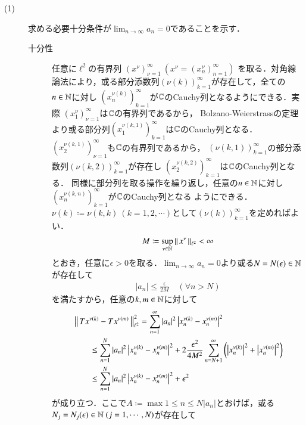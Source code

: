 	\begin{prf}\mbox{}
		\begin{description}
			\item[(1)] 求める必要十分条件が$\lim_{n \to \infty} a_n = 0$であることを示す．
				\begin{description}
					\item[十分性] 任意に$\ell^2$の有界列
						$\left( x^{\nu} \right)_{\nu=1}^{\infty}\ \left(x^{\nu} = \left( x^{\nu}_n \right)_{n=1}^{\infty} \right)$
						を取る．対角線論法により，或る部分添数列$(\nu(k))_{k=1}^{\infty}$が存在して，全ての$n \in \mathbb{N}$に対し
						$\left(x_n^{\nu(k)} \right)_{k=1}^{\infty}$が$\mathbb{C}$のCauchy列となるようにできる．実際
						$\left( x^{\nu}_1 \right)_{\nu=1}^{\infty}$は$\mathbb{C}$の有界列であるから，
						Bolzano-Weierstrassの定理より或る部分列$\left( x^{\nu(k,1)}_1 \right)_{k=1}^{\infty}$は$\mathbb{C}$のCauchy列となる．
						$\left( x^{\nu(k,1)}_2 \right)_{\nu=1}^{\infty}$も$\mathbb{C}$の有界列であるから，
						$(\nu(k,1))_{k=1}^{\infty}$の部分添数列$(\nu(k,2))_{k=1}^{\infty}$が存在し
						$\left( x^{\nu(k,2)}_2 \right)_{k=1}^{\infty}$は$\mathbb{C}$のCauchy列となる．
						同様に部分列を取る操作を繰り返し，任意の$n \in \mathbb{N}$に対し
						$\left( x^{\nu(k,n)}_n \right)_{k=1}^{\infty}$が$\mathbb{C}$のCauchy列となる
						ようにできる．$\nu(k) \coloneqq \nu(k,k)\ (k=1,2,\cdots)$として$(\nu(k))_{k=1}^{\infty}$を定めればよい．
						\begin{align}
							M \coloneqq \operatorname*{sup}_{\nu \in \mathbb{N}} \left\|\, x^\nu\, \right\|_{\ell^2} < \infty
						\end{align}
						とおき，任意に$\epsilon > 0$を取る．$\lim_{n \to \infty} a_n = 0$より或る$N = N(\epsilon) \in \mathbb{N}$が存在して
						\begin{align}
							|a_n| \leq \frac{\epsilon}{2 M} \quad (\forall n > N)
						\end{align}
						を満たすから，任意の$k,m \in \mathbb{N}$に対して
						\begin{align}
							&\left\|\, T x^{\nu(k)} - T x^{\nu(m)}\, \right\|_{\ell^2}^2
							= \sum_{n=1}^{\infty} |a_n|^2 \left|x_n^{\nu(k)} - x_n^{\nu(m)} \right|^2 \\
							&\qquad \leq \sum_{n=1}^{N} |a_n|^2 \left|x_n^{\nu(k)} - x_n^{\nu(m)} \right|^2 
								+ 2 \frac{\epsilon^2}{4 M^2} \sum_{n = N+1}^{\infty} \left( \left|x_n^{\nu(k)} \right|^2 + \left|x_n^{\nu(m)} \right|^2 \right) \\
							&\qquad \leq \sum_{n=1}^{N} |a_n|^2 \left|x_n^{\nu(k)} - x_n^{\nu(m)} \right|^2 + \epsilon^2
						\end{align}
						が成り立つ．ここで$A \coloneqq \max{1 \leq n \leq N}{|a_n|}$とおけば，或る$N_j = N_j(\epsilon) \in \N\ (j=1,\cdots,N)$が存在して

\end{description}
\end{description}
\end{prf}
